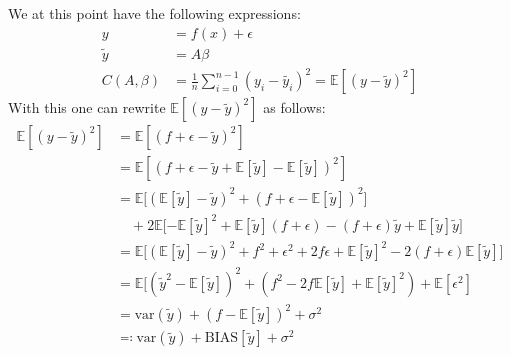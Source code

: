 \documentclass[12pt]{scrartcl}
\begin{document}
We at this point have the following expressions:
\begin{align}
	y & = f(x) + \epsilon \\
	\tilde{y} &= A\beta \\
	C(A,\beta) &= \frac{1}{n} \sum_{i=0}^{n-1}(y_i-\tilde{y_i})^2 = \mathbb{E}[(y-\tilde{y})^2]
\end{align}
With this one can rewrite $\mathbb{E}[(y-\tilde{y})^2]$ as follows:
\begin{align}
	\mathbb{E}[(y-\tilde{y})^2] &= \mathbb{E}[(f+\epsilon-\tilde{y})^2] \\
								&= \mathbb{E}[(f+\epsilon-\tilde{y} + \mathbb{E}[\tilde{y}]- \mathbb{E}[\tilde{y}])^2] \\
								&= \mathbb{E}\Big[(\mathbb{E}[\tilde{y}]-\tilde{y})^2 + (f+\epsilon-\mathbb{E}[\tilde{y}])^2] \\ &\quad +2\mathbb{E}[-\mathbb{E}[\tilde{y}]^2+\mathbb{E}[\tilde{y}](f+\epsilon) - (f+\epsilon)\tilde{y} + \mathbb{E}[\tilde{y}]\tilde{y}\Big] \\
								&= \mathbb{E}\Big[(\mathbb{E}[\tilde{y}]-\tilde{y})^2 + f^2 + \epsilon^2 + 2f\epsilon +\mathbb{E}[\tilde{y}]^2 -2(f+\epsilon)\mathbb{E}[\tilde{y}]\Big] \\
								&= \mathbb{E}[(\tilde{y}^2-\mathbb{E}[\tilde{y}])^2 + (f^2 - 2f\mathbb{E}[\tilde{y}]+\mathbb{E}[\tilde{y}]^2) + \mathbb{E}[\epsilon^2] \\
								&= \text{var}(\tilde{y}) + (f - \mathbb{E}[\tilde{y}])^2 + \sigma^2 \\
								&\eqqcolon \text{var}(\tilde{y}) + \text{BIAS}[\tilde{y}] + \sigma^2
\end{align}
\end{document}
